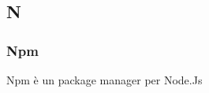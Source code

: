 \subsection*{\textbf{\hfill \Huge{N} \hfill}} 
\subsubsection*{Npm}
Npm è un package manager per Node.Js
